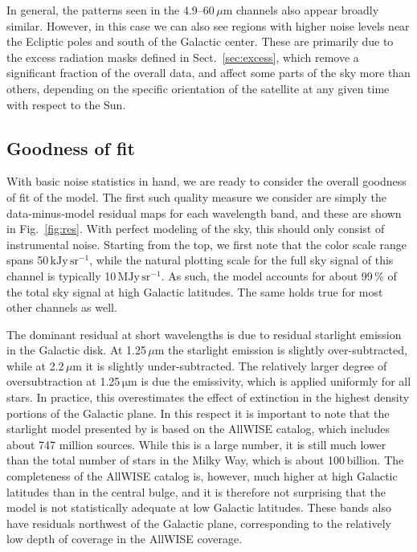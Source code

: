 \documentclass{aa}
\begin{document}
In general, the patterns seen in the 4.9--60$\,\mu$m channels also
appear broadly similar. However, in this case we can also see regions
with higher noise levels near the Ecliptic poles and south of the
Galactic center. These are primarily due to the excess radiation masks
defined in Sect.~\ref{sec:excess}, which remove a significant
fraction of the overall data, and affect some parts of the sky more
than others, depending on the specific orientation of the satellite at
any given time with respect to the Sun.



\subsection{Goodness of fit}

With basic noise statistics in hand, we are ready to consider the
overall goodness of fit of the model. The first such quality measure
we consider are simply the data-minus-model residual maps for each
wavelength band, and these are shown in Fig.~\ref{fig:res}. With perfect modeling of the sky, this should only consist of instrumental noise. Starting
from the top, we first note that the color scale range spans
50\,$\mathrm{kJy\,sr^{-1}}$, while the natural plotting scale for the full sky signal
of this channel is typically 10\,M$\mathrm{Jy\,sr^{-1}}$. As such, the model accounts
for about 99\,\% of the total sky signal at high Galactic
latitudes. The same holds true for most other channels as well.

The dominant residual at short wavelengths is due to
residual starlight emission in the Galactic disk. At 1.25$\,\mu$m the starlight emission is
slightly over-subtracted, while at 2.2\,$\mu$m it is slightly
under-subtracted. {The relatively larger degree of oversubtraction at 1.25$\,\mathrm{\mu m}$ is due the emissivity, which is applied uniformly for all stars. In practice, this overestimates the effect of extinction in the highest density portions of the Galactic plane.} In this respect it is important to note that the
starlight model presented by \citet{CG02_04} is based on the {AllWISE}
catalog, which includes about 747 million sources. While this is a
large number, it is still much lower than the total number of stars in
the Milky Way, which is about 100\,billion. The completeness of the
{AllWISE} catalog is, however, much higher at high Galactic latitudes than
in the central bulge, and it is therefore not surprising that the
model is not statistically adequate at low Galactic latitudes.
{These bands also have residuals northwest of the Galactic plane, corresponding to the relatively low depth of coverage in the AllWISE coverage.}
       
\end{document}
